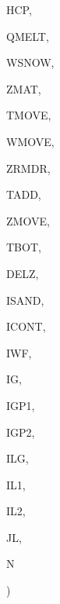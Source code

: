 {\begin{DoxyParamCaption}
\item[{real, dimension   (ilg,ig)}]{H\+C\+P, }
\item[{real, dimension (ilg)}]{Q\+M\+E\+L\+T, }
\item[{real, dimension (ilg)}]{W\+S\+N\+O\+W, }
\item[{real, dimension  (ilg,igp2,igp1)}]{Z\+M\+A\+T, }
\item[{real, dimension (ilg,igp2)}]{T\+M\+O\+V\+E, }
\item[{real, dimension (ilg,igp2)}]{W\+M\+O\+V\+E, }
\item[{real, dimension (ilg,igp1)}]{Z\+R\+M\+D\+R, }
\item[{real, dimension  (ilg)}]{T\+A\+D\+D, }
\item[{real, dimension (ilg)}]{Z\+M\+O\+V\+E, }
\item[{real, dimension  (ilg)}]{T\+B\+O\+T, }
\item[{real, dimension  (ig)}]{D\+E\+L\+Z, }
\item[{integer, dimension (ilg,ig)}]{I\+S\+A\+N\+D, }
\item[{integer, dimension (ilg)}]{I\+C\+O\+N\+T, }
\item[{integer}]{I\+W\+F, }
\item[{integer}]{I\+G, }
\item[{integer}]{I\+G\+P1, }
\item[{integer}]{I\+G\+P2, }
\item[{integer}]{I\+L\+G, }
\item[{integer}]{I\+L1, }
\item[{integer}]{I\+L2, }
\item[{integer}]{J\+L, }
\item[{integer}]{N}
\end{DoxyParamCaption}
)}\label{ICEBAL_8f_abefb862d3860a7222b2eaa981efb2701}

